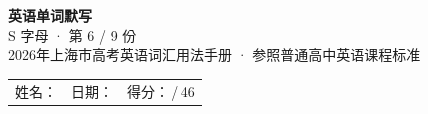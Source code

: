\documentclass[10pt,a4paper]{article}
\begin{document}
\pagestyle{plain}

\begin{center}
{\LARGE\bfseries 英语单词默写}\\[0.22em]
{\large S 字母 · 第 6 / 9 份}\\[0.18em]
{\small 2026年上海市高考英语词汇用法手册 · 参照普通高中英语课程标准}
\end{center}

\vspace{0.25em}
\noindent\begin{tabular}{@{}p{}@{}p{}@{}p{}@{}}
姓名：\underline{\hspace{2.0cm}} & 日期：\underline{\hspace{2.0cm}} & 得分：\underline{\hspace{1.3cm}}\,/\,46 \\
\end{tabular}

\vspace{0.3em}

\vspace{0.08em}
\end{document}
